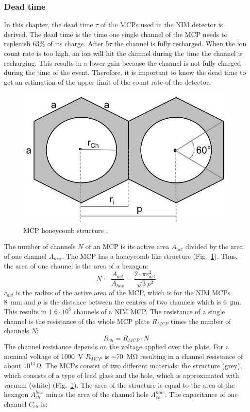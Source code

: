 	\subsubsection{Dead time}
	In this chapter, the dead time $\tau$ of the MCPs used in the NIM detector is derived. The dead time is the time one single channel of the MCP needs to replenish 63\% of its charge. After 5$\tau$ the channel is fully recharged. When the ion count rate is too high, an ion will hit the channel during the time the channel is recharging. This results in a lower gain because the channel is not fully charged during the time of the event. Therefore, it is important to know the dead time to get an estimation of the upper limit of the count rate of the detector.\\
	\begin{figure}[H]
		\centering
		\includegraphics[width=.4\textwidth]{Bilder/MCP_hex.jpg}
		\caption{MCP honeycomb structure \cite{Diss_Neuland}.}
		\label{fig:MCPhex}
	\end{figure}
	The number of channels $N$ of an MCP is its active area $A_{act}$ divided by the area of one channel $A_{hex}$. The MCP has a honeycomb like structure (Fig.~\ref{fig:MCPhex}). Thus, the area of one channel is the area of a hexagon:
	\begin{equation}
		N = \frac{A_{act}}{A_{hex}} = \frac{2\cdot\pi r^2_{act}}{\sqrt{3}p^2}
	\end{equation}
	$r_{act}$ is the radius of the active area of the MCP, which is for the NIM MCPs 8~mm and $p$ is the distance between the centres of two channels which is 6~\si{\micro\meter}. This results in $1.6\cdot10^6$ channels of a NIM MCP. The resistance of a single channel is the resistance of the whole MCP plate $R_{MCP}$ times the number of channels $N$:
	\begin{equation}
		R_{ch} = R_{MCP}\cdot N
	\end{equation}
	The channel resistance depends on the voltage applied over the plate. For a nominal voltage of 1000~\si{\volt} $R_{MCP}$ is $\sim$70~\si{\mega\ohm} resulting in a channel resistance of about $10^{14}$\,\si{\ohm}. The MCPs consist of two different materials: the structure (grey), which consists of a type of lead glass and the hole, which is approximated with vacuum (white) (Fig.~\ref{fig:MCPhex}). The area of the structure is equal to the area of the hexagon $A^{hex}_{ch}$ minus the area of the channel hole $A^{hole}_{ch}$. The capacitance of one channel $C_{ch}$ is:
